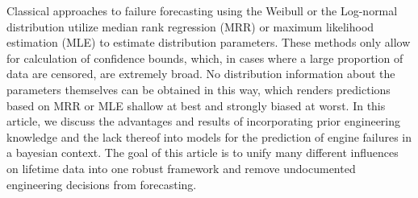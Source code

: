 Classical approaches to failure forecasting using the Weibull or the Log-normal distribution utilize median rank regression (MRR) or maximum likelihood estimation (MLE) to estimate distribution parameters. These methods only allow for calculation of confidence bounds, which, in cases where a large proportion of data are censored, are extremely broad. No distribution information about the parameters themselves can be obtained in this way, which renders predictions based on MRR or MLE shallow at best and strongly biased at worst. In this article, we discuss the advantages and results of incorporating prior engineering knowledge and the lack thereof into models for the prediction of engine failures in a bayesian context. The goal of this article is to unify many different influences on lifetime data into one robust framework and remove undocumented engineering decisions from forecasting. 
